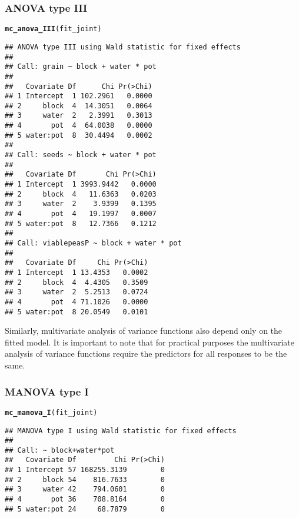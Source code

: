 \documentclass[article]{jss}\usepackage[]{graphicx}\usepackage[]{xcolor}
\makeatletter
\newcommand{\hlstd}[1]{\textcolor[rgb]{0.345,0.345,0.345}{#1}}%
\newcommand{\hlkwd}[1]{\textcolor[rgb]{0.737,0.353,0.396}{\textbf{#1}}}%
\newenvironment{kframe}{%
 \def\at@end@of@kframe{}%
 \ifinner\ifhmode%
  \def\at@end@of@kframe{\end{minipage}}%
  \begin{minipage}{\columnwidth}%
 \fi\fi%
 \def\FrameCommand##1{\hskip\@totalleftmargin \hskip-\fboxsep
 \colorbox{shadecolor}{##1}\hskip-\fboxsep
     \hskip-\linewidth \hskip-\@totalleftmargin \hskip\columnwidth}%
 \MakeFramed {\advance\hsize-\width
   \@totalleftmargin\z@ \linewidth\hsize
   \@setminipage}}%
 {\par\unskip\endMakeFramed%
 \at@end@of@kframe}
\newenvironment{knitrout}{}{} %
\makeatother
\begin{document}
\subsubsection{ANOVA type III}

\begin{knitrout}
\color{fgcolor}\begin{kframe}
\begin{alltt}
\hlkwd{mc_anova_III}\hlstd{(fit_joint)}
\end{alltt}
\begin{verbatim}
## ANOVA type III using Wald statistic for fixed effects
## 
## Call: grain ~ block + water * pot
## 
##   Covariate Df      Chi Pr(>Chi)
## 1 Intercept  1 102.2961   0.0000
## 2     block  4  14.3051   0.0064
## 3     water  2   2.3991   0.3013
## 4       pot  4  64.0038   0.0000
## 5 water:pot  8  30.4494   0.0002
## 
## Call: seeds ~ block + water * pot
## 
##   Covariate Df       Chi Pr(>Chi)
## 1 Intercept  1 3993.9442   0.0000
## 2     block  4   11.6363   0.0203
## 3     water  2    3.9399   0.1395
## 4       pot  4   19.1997   0.0007
## 5 water:pot  8   12.7366   0.1212
## 
## Call: viablepeasP ~ block + water * pot
## 
##   Covariate Df     Chi Pr(>Chi)
## 1 Intercept  1 13.4353   0.0002
## 2     block  4  4.4305   0.3509
## 3     water  2  5.2513   0.0724
## 4       pot  4 71.1026   0.0000
## 5 water:pot  8 20.0549   0.0101
\end{verbatim}
\end{kframe}
\end{knitrout}

Similarly, multivariate analysis of variance functions also depend only on the fitted model. It is important to note that for practical purposes the multivariate analysis of variance functions require the predictors for all responses to be the same.

\subsubsection{MANOVA type I}

\begin{knitrout}
\color{fgcolor}\begin{kframe}
\begin{alltt}
\hlkwd{mc_manova_I}\hlstd{(fit_joint)}
\end{alltt}
\begin{verbatim}
## MANOVA type I using Wald statistic for fixed effects
## 
## Call: ~ block+water*pot
##   Covariate Df         Chi Pr(>Chi)
## 1 Intercept 57 168255.3139        0
## 2     block 54    816.7633        0
## 3     water 42    794.0601        0
## 4       pot 36    708.8164        0
## 5 water:pot 24     68.7879        0
\end{verbatim}
\end{kframe}
\end{knitrout}
\end{document}
